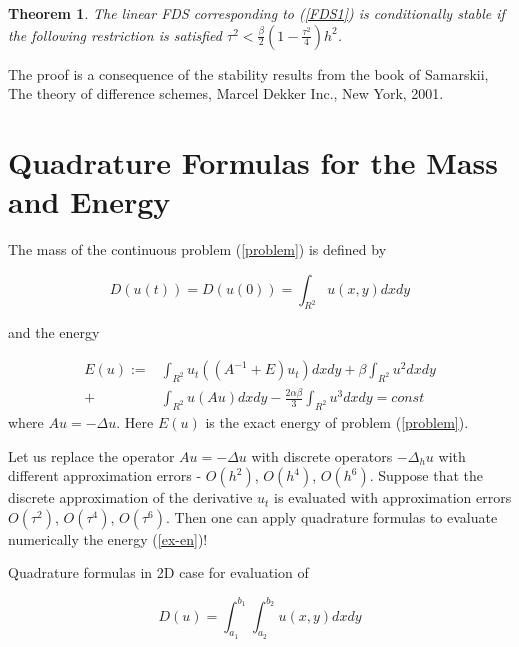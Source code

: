 \documentclass[%
 aip,
cp,  %
 amsmath,amssymb,%
 reprint,%
]{revtex4-2}
\newcommand{\rf}[1]{(\ref{#1})}
\newtheorem{thm}{Theorem}
\begin{document}
\begin{thm}
The linear FDS corresponding to \rf{FDS1} is conditionally stable if
the following restriction is satisfied
$\tau^2 < \frac{\beta}{2}(1-\frac{\tau^2}{4}) h^2$.

\end{thm}
The proof is a consequence of the stability results from the book of
 Samarskii,  The theory of difference schemes, Marcel Dekker Inc., New York, 2001.


\section{Quadrature Formulas for the Mass and Energy}
The mass of the continuous problem \rf{problem} is defined by

\begin{equation}\label{int}
D(u(t))=D(u(0))=\int_{R^2} u(x,y)dx dy
\end{equation}

and the energy 

\begin{align}\label{ex-en}
E(u):=&\int_{R^2} u_t \left((A^{-1}+E)u_t\right) dxdy+
\beta \int_{R^2} u^2 dxdy \nonumber\\
+& \int_{R^2}u \left(A u\right) dxdy
-\frac{2 \alpha \beta}{3} \int_{R^2} u^3 dxdy =const
\end{align}
where $Au=-\Delta u$. Here $E(u)$ is the exact energy of problem \rf{problem}.

Let us replace the operator $Au=-
\Delta u$ with discrete operators $-\Delta_h u$ with different approximation errors - $O(h^2)$, $O(h^4)$, $O(h^6)$. Suppose that the discrete approximation of the derivative $u_t$ is evaluated with approximation errors $O(\tau^2)$, $O(\tau^4)$, $O(\tau^6)$. Then one can apply quadrature formulas to evaluate numerically the energy \rf{ex-en}!




Quadrature formulas in 2D case for evaluation of 

\begin{equation}\label{int}
D(u)=\int_{a_1}^{b_1} \int_{a_2}^{b_2} u(x,y)dx dy
\end{equation}
\end{document}
